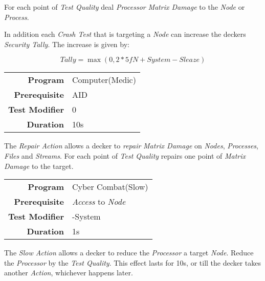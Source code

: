 \hfill

For each point of \emph{Test Quality} deal \emph{Processor} \emph{Matrix Damage}
to the \emph{Node} or \emph{Process}.

In addition each \emph{Crash Test} that is targeting a \emph{Node}
can increase the deckers \emph{Security Tally}.
The increase is given by:

\begin{equation*}
    \textit{Tally} = \max(0, 2 * \textit{5fN} + \textit{System} - \textit{Sleaze})
\end{equation*}

\label{par:repair}


\begin{tabular}{rl}
    \textbf{Program}       & Computer(Medic) \\
    \textbf{Prerequisite}  & AID             \\
    \textbf{Test Modifier} & 0               \\
    \textbf{Duration}      & 10s             \\
\end{tabular}

\hfill

The \emph{Repair Action} allows a decker to \emph{repair} \emph{Matrix Damage}
on \emph{Nodes}, \emph{Processes}, \emph{Files} and \emph{Streams}.
For each point of \emph{Test Quality} repairs one point of \emph{Matrix Damage}
to the target.


\label{par:slow node}


\begin{tabular}{rl}
    \textbf{Program}       & Cyber Combat(Slow)           \\
    \textbf{Prerequisite}  & \emph{Access} to \emph{Node} \\
    \textbf{Test Modifier} & -System                      \\
    \textbf{Duration}      & 1s                           \\
\end{tabular}

\hfill

The \emph{Slow Action} allows a decker to reduce the \emph{Processor} a target
\emph{Node}. Reduce the \emph{Processor} by the \emph{Test Quality}. This effect
lasts for 10s, or till the decker takes another \emph{Action}, whichever happens
later.

\label{par:slow process}


